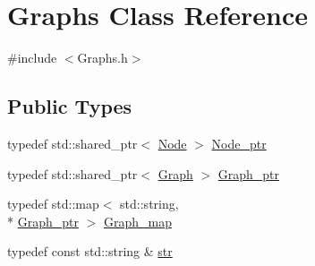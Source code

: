 \hypertarget{classGraphs}{\section{Graphs Class Reference}
\label{classGraphs}
}


{\ttfamily \#include $<$Graphs.\-h$>$}

\subsection*{Public Types}
\begin{DoxyCompactItemize}
\item 
typedef std\-::shared\-\_\-ptr$<$ \hyperlink{structNode}{Node} $>$ \hyperlink{classGraphs_a2804b752d72989344f11a6ec3145eea8}{Node\-\_\-ptr}
\item 
typedef std\-::shared\-\_\-ptr$<$ \hyperlink{classGraph}{Graph} $>$ \hyperlink{classGraphs_a58b4b65d81870fc3b2936c068b644a4d}{Graph\-\_\-ptr}
\item 
typedef std\-::map$<$ std\-::string, \\*
\hyperlink{classGraphs_a58b4b65d81870fc3b2936c068b644a4d}{Graph\-\_\-ptr} $>$ \hyperlink{classGraphs_ae84f43c27f4abeec92270c954a9255d4}{Graph\-\_\-map}
\item 
typedef const std\-::string \& \hyperlink{classGraphs_a98a6f0415cbeae8adc7500164c78e3f3}{str}
\end{DoxyCompactItemize}
